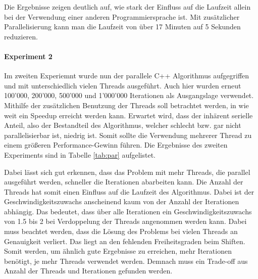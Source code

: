\documentclass[sigconf]{acmart}
\begin{document}
Die Ergebnisse zeigen deutlich auf, wie stark der Einfluss auf die Laufzeit allein bei der Verwendung einer anderen Programmiersprache ist. Mit zusätzlicher Parallelisierung kann man die Laufzeit von über 17 Minuten auf 5 Sekunden reduzieren.

\paragraph{Experiment 2}

Im zweiten Experiemnt wurde nun der parallele C++ Algorithmus aufgegriffen und mit unterschiedlich vielen Threads ausgeführt. Auch hier wurden erneut 100'000, 200'000, 500'000 und 1'000'000 Iterationen als Ausgangslage verwendet. Mithilfe der zusätzlichen Benutzung der Threads soll betrachtet werden, in wie weit ein Speedup erreicht werden kann. Erwartet wird, dass der inhärent serielle Anteil, also der Bestandteil des Algorithmus, welcher schlecht bzw. gar nicht parallelisierbar ist, niedrig ist. Somit sollte die Verwendung mehrerer Thread zu einem größeren Performance-Gewinn führen. 
Die Ergebnisse des zweiten Experiments sind in Tabelle \ref{tab:par} aufgelistet. 


\begin{table}[htbp]
  \caption{Vergleich der des parallelen C++ Algorithmus mit unterschiedlich vielen Threads über 100'000, 200'000, 500'000 und 1'000'000 Iterationen. Alle Angaben in Sekunden.}
  \label{tab:par}
\end{table}

Dabei lässt sich gut erkennen, dass das Problem mit mehr Threads, die parallel ausgeführt werden, schneller die Iterationen abarbeiten kann. Die Anzahl der Threads hat somit einen Einfluss auf die Laufzeit des Algorithmus. Dabei ist der Geschwindigkeitszuwachs anscheinend kaum von der Anzahl der Iterationen abhängig. Das bedeutet, dass über alle Iterationen ein Geschwindigkeitszuwachs von 1.5 bis 2 bei Verdoppelung der Threads angenommen werden kann. Dabei muss beachtet werden, dass die Lösung des Problems bei vielen Threads an Genauigkeit verliert. Das liegt an den fehlenden Freiheitsgraden beim Shiften. Somit werden, um ähnlich gute Ergebnisse zu erreichen, mehr Iterationen benötigt, je mehr Threads verwendet werden. Demnach muss ein Trade-off aus Anzahl der Threads und Iterationen gefunden werden.
\end{document}
